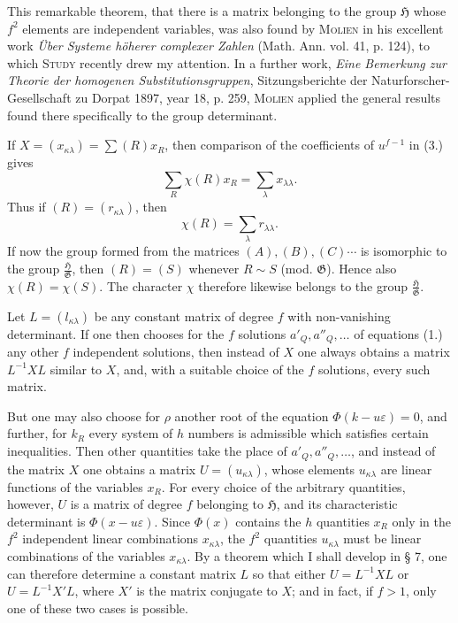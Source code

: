 \documentclass[11pt]{article}
\newcommand{\Hgrp}{\mathfrak{H}}
\newcommand{\Ggrp}{\mathfrak{G}}
\newcommand{\eps}{\varepsilon}
\begin{document}
This remarkable theorem, that there is a matrix belonging to the group $\Hgrp$ whose $f^2$ elements are independent variables, was also found by \textsc{Molien} in his excellent work \emph{Über Systeme höherer complexer Zahlen} (Math. Ann. vol. 41, p. 124), to which \textsc{Study} recently drew my attention. In a further work, \emph{Eine Bemerkung zur Theorie der homogenen Substitutionsgruppen}, Sitzungsberichte der Naturforscher-Gesellschaft zu Dorpat 1897, year 18, p. 259, \textsc{Molien} applied the general results found there specifically to the group determinant.

If $X=(x_{\kappa\lambda})=\sum(R)x_R$, then comparison of the coefficients of $u^{f-1}$ in (3.) gives
\begin{equation}\tag{4.}
\sum_R\chi(R)x_R=\sum_\lambda x_{\lambda\lambda}.
\end{equation}
Thus if $(R)=(r_{\kappa\lambda})$, then
\begin{equation}\tag{5.}
\chi(R)=\sum_\lambda r_{\lambda\lambda}.
\end{equation}
If now the group formed from the matrices $(A),(B),(C)\cdots$ is isomorphic to the group $\frac{\Hgrp}{\Ggrp}$, then $(R)=(S)$ whenever $R\sim S$ (mod. $\Ggrp$). Hence also $\chi(R)=\chi(S)$. The character $\chi$ therefore likewise belongs to the group $\frac{\Hgrp}{\Ggrp}$.

Let $L=(l_{\kappa\lambda})$ be any constant matrix of degree $f$ with non-vanishing determinant. If one then chooses for the $f$ solutions $a'_Q,a''_Q,\ldots$ of equations (1.) any other $f$ independent solutions, then instead of $X$ one always obtains a matrix $L^{-1}XL$ similar to $X$, and, with a suitable choice of the $f$ solutions, every such matrix.

But one may also choose for $\rho$ another root of the equation $\Phi(k-u\eps)=0$, and further, for $k_R$ every system of $h$ numbers is admissible which satisfies certain inequalities. Then other quantities take the place of $a'_Q,a''_Q,\ldots$, and instead of the matrix $X$ one obtains a matrix $U=(u_{\kappa\lambda})$, whose elements $u_{\kappa\lambda}$ are linear functions of the variables $x_R$. For every choice of the arbitrary quantities, however, $U$ is a matrix of degree $f$ belonging to $\Hgrp$, and its characteristic determinant is $\Phi(x-u\eps)$. Since $\Phi(x)$ contains the $h$ quantities $x_R$ only in the $f^2$ independent linear combinations $x_{\kappa\lambda}$, the $f^2$ quantities $u_{\kappa\lambda}$ must be linear combinations of the variables $x_{\kappa\lambda}$. By a theorem which I shall develop in § 7, one can therefore determine a constant matrix $L$ so that either $U=L^{-1}XL$ or $U=L^{-1}X'L$, where $X'$ is the matrix conjugate to $X$; and in fact, if $f>1$, only one of these two cases is possible.
\end{document}
